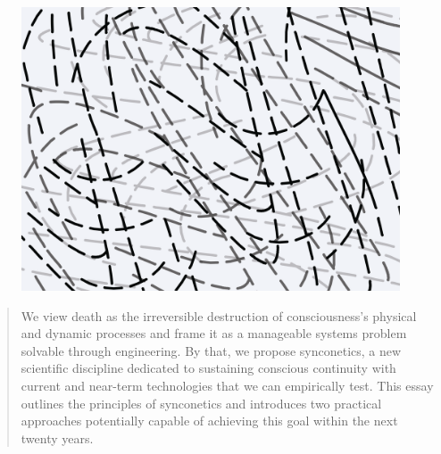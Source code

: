 \documentclass[10pt]{article}
\begin{document}
\begin{sloppypar}

  \begin{figure}[ht]
    \centering
    \includegraphics[width=\textwidth]{figures/cover.png}
    \label{fig:cover}
  \end{figure}
  \newpage



  \begin{abstract}
    We view death as the irreversible destruction of consciousness’s physical and dynamic processes and frame it as a manageable systems problem solvable through engineering. By that, we propose synconetics, a new scientific discipline dedicated to sustaining conscious continuity with current and near-term technologies that we can empirically test. This essay outlines the principles of synconetics and introduces two practical approaches potentially capable of achieving this goal within the next twenty years.
  \end{abstract}

  \pagebreak
  \tableofcontents
  \pagebreak
  \listoffigures
  \pagebreak



\end{sloppypar}
\end{document}
